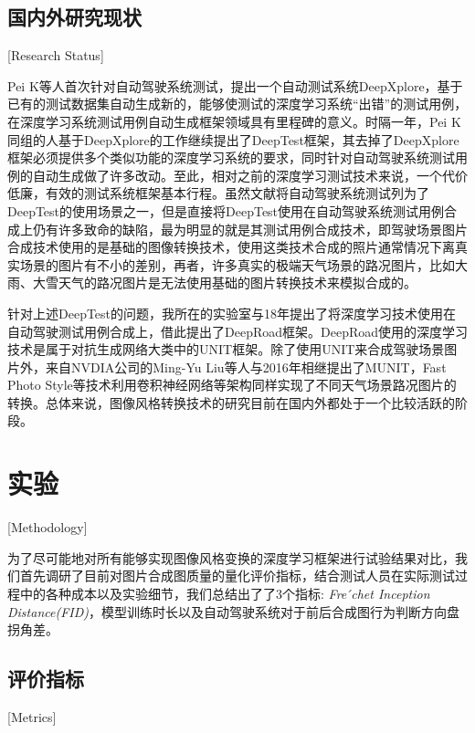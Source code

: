 
\section{国内外研究现状}[Research Status]

Pei K\cite{DeepXplore}等人首次针对自动驾驶系统测试，提出一个自动测试系统DeepXplore，基于已有的测试数据集自动生成新的，能够使测试的深度学习系统“出错”的测试用例，在深度学习系统测试用例自动生成框架领域具有里程碑的意义。时隔一年，Pei K同组的人基于DeepXplore的工作继续提出了DeepTest\cite{DeepTest}框架，其去掉了DeepXplore框架必须提供多个类似功能的深度学习系统的要求，同时针对自动驾驶系统测试用例的自动生成做了许多改动。至此，相对之前的深度学习测试技术来说，一个代价低廉，有效的测试系统框架基本行程。虽然文献\cite{DeepTest}将自动驾驶系统测试列为了DeepTest的使用场景之一，但是直接将DeepTest使用在自动驾驶系统测试用例合成上仍有许多致命的缺陷，最为明显的就是其测试用例合成技术，即驾驶场景图片合成技术使用的是基础的图像转换技术，使用这类技术合成的照片通常情况下离真实场景的图片有不小的差别，再者，许多真实的极端天气场景的路况图片，比如大雨、大雪天气的路况图片是无法使用基础的图片转换技术来模拟合成的。

针对上述DeepTest的问题，我所在的实验室与18年提出了将深度学习技术使用在自动驾驶测试用例合成上，借此提出了DeepRoad框架\cite{DeepRoad}。DeepRoad使用的深度学习技术是属于对抗生成网络大类中的UNIT\cite{UNIT}框架。除了使用UNIT来合成驾驶场景图片外，来自NVDIA公司的Ming-Yu Liu等人与2016年相继提出了MUNIT\cite{MUNIT}，Fast Photo Style\cite{fps}等技术利用卷积神经网络等架构同样实现了不同天气场景路况图片的转换。总体来说，图像风格转换技术的研究目前在国内外都处于一个比较活跃的阶段。


\chapter{实验}[Methodology]


为了尽可能地对所有能够实现图像风格变换的深度学习框架进行试验结果对比，我们首先调研了目前对图片合成图质量的量化评价指标，结合测试人员在实际测试过程中的各种成本以及实验细节，我们总结出了了3个指标: \textit{Fre ́chet Inception Distance(FID)}\cite{FID}，模型训练时长以及自动驾驶系统对于前后合成图行为判断方向盘拐角差。

\section{评价指标}[Metrics]

